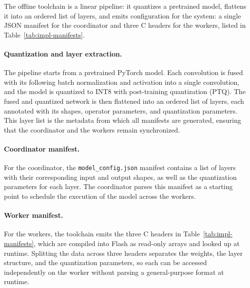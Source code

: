 The offline toolchain is a linear pipeline: it quantizes a pretrained model, flattens it into an ordered list of layers, and emits configuration for the system: a single JSON manifest for the coordinator and three C headers for the workers, listed in Table~\ref{tab:impl-manifests}.


\paragraph{Quantization and layer extraction.}
The pipeline starts from a pretrained PyTorch model.
Each convolution is fused with its following batch normalization and activation into a single convolution, and the model is quantized to INT8 with post-training quantization (PTQ).
The fused and quantized network is then flattened into an ordered list of layers, each annotated with its shapes, operator parameters, and quantization parameters.
This layer list is the metadata from which all manifests are generated, ensuring that the coordinator and the workers remain synchronized.

\paragraph{Coordinator manifest.}
For the coordinator, the \verb|model_config.json| manifest contains a list of layers with their corresponding input and output shapes, as well as the quantization parameters for each layer. 
The coordinator parses this manifest as a starting point to schedule the execution of the model across the workers. 

\paragraph{Worker manifest.}
For the workers, the toolchain emits the three C headers in Table~\ref{tab:impl-manifests}, which are compiled into Flash as read-only arrays and looked up at runtime.
Splitting the data across three headers separates the weights, the layer structure, and the quantization parameters, so each can be accessed independently on the worker without parsing a general-purpose format at runtime.

